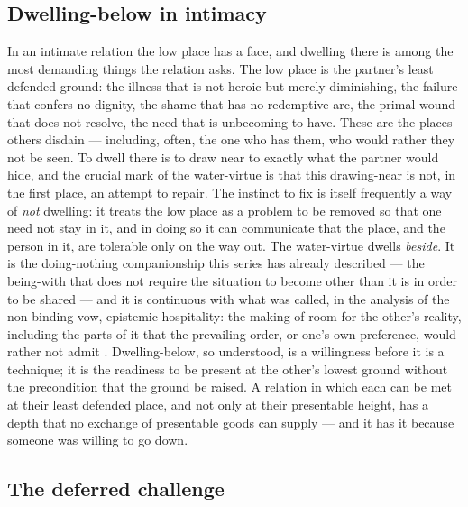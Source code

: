 \subsection{Dwelling-below in intimacy}
\label{p20:sub:low-intimacy}

In an intimate relation the low place has a face, and dwelling there is among the most demanding things the relation asks. The low place is the partner's least defended ground: the illness that is not heroic but merely diminishing, the failure that confers no dignity, the shame that has no redemptive arc, the primal wound that does not resolve, the need that is unbecoming to have. These are the places others disdain --- including, often, the one who has them, who would rather they not be seen. To dwell there is to draw near to exactly what the partner would hide, and the crucial mark of the water-virtue is that this drawing-near is not, in the first place, an attempt to repair. The instinct to fix is itself frequently a way of \emph{not} dwelling: it treats the low place as a problem to be removed so that one need not stay in it, and in doing so it can communicate that the place, and the person in it, are tolerable only on the way out. The water-virtue dwells \emph{beside}. It is the doing-nothing companionship this series has already described --- the being-with that does not require the situation to become other than it is in order to be shared \parencite{paperxix} --- and it is continuous with what was called, in the analysis of the non-binding vow, epistemic hospitality: the making of room for the other's reality, including the parts of it that the prevailing order, or one's own preference, would rather not admit \parencite{paperxiii}. Dwelling-below, so understood, is a willingness before it is a technique; it is the readiness to be present at the other's lowest ground without the precondition that the ground be raised. A relation in which each can be met at their least defended place, and not only at their presentable height, has a depth that no exchange of presentable goods can supply --- and it has it because someone was willing to go down.

\subsection{The deferred challenge}
\label{p20:sub:low-nietzsche}

